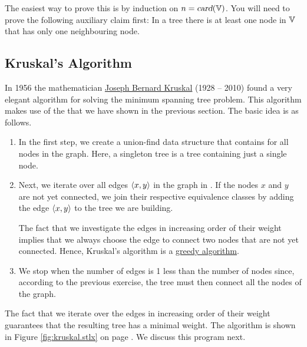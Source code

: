 \hint
The easiest way to prove this is by induction on $n = \textsl{card}(\mathbb{V})$.  You will need to prove the
following auxiliary claim first: In a tree there is at least one node in ${\mathbb V}$ that has
only one neighbouring node. 
\eox

\subsection{Kruskal's Algorithm}
In 1956 the mathematician \href{https://en.wikipedia.org/wiki/Joseph_Kruskal}{Joseph Bernard Kruskal} (1928 -- 2010) 
found a very elegant algorithm for solving the minimum spanning tree problem.   This algorithm makes use
of the  that we have shown in the previous section.  The basic idea is as
follows.
\begin{enumerate}
\item In the first step, we create a union-find data structure that contains 
      for all nodes in the graph.  Here, a singleton tree is a tree containing just a single node.
\item Next, we iterate over all edges $\pair(x, y)$ in the graph in .
      If the nodes $x$ and $y$ are not yet connected, we join their respective equivalence classes by adding
      the edge $\pair(x, y)$ to the tree we are building.

      The fact that we investigate the edges in increasing order of their weight implies that we always choose
      the  edge to connect two nodes that are not yet connected.  Hence, Kruskal's algorithm is a
      \href{https://en.wikipedia.org/wiki/Greedy_algorithm}{greedy algorithm}.
\item We stop when the number of edges is 1 less than the number of nodes since, according to the
      previous exercise, the tree must then connect all the nodes of the graph. 
\end{enumerate}
The fact that we iterate over the edges in increasing order of their weight guarantees that the
resulting tree has a minimal weight.
The algorithm is shown in Figure \ref{fig:kruskal.stlx} on page \pageref{fig:kruskal.stlx}.  We
discuss this program next. 

